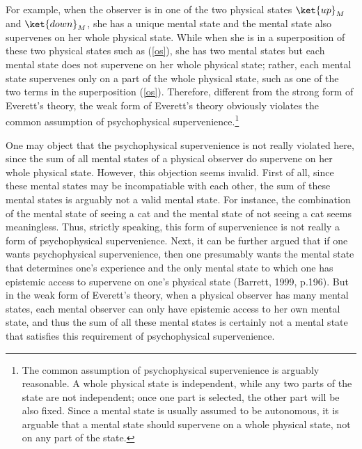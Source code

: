 For example, when the observer is in one of the two physical states  $\ket{up}_M$ and $\ket{down}_M$, she has a unique mental state and the mental state also supervenes on her whole physical state. While when she is in a superposition of these two physical states such as (\ref{os}), she has two mental states but each mental state does not supervene on her whole physical state; rather, each mental state supervenes only on a part of the whole physical state, such as one of the two terms in the superposition (\ref{os}).
Therefore, different from the strong form of Everett's theory,  the weak form of Everett's theory obviously violates the common assumption of psychophysical supervenience.\footnote{The common assumption of psychophysical supervenience is arguably reasonable. A whole physical state is independent, while any two parts of the state are not independent; once one part is selected, the other part will be also fixed. Since a mental state is usually assumed to be autonomous, it is arguable that a mental state should supervene on a whole physical state, not on any part of the state.}

One may object that the psychophysical supervenience is not really violated here, since the sum of all mental states of a physical observer do supervene on her whole physical state.
However, this objection seems invalid.
First of all, since these mental states may be incompatiable with each other, the sum of these mental states is arguably not a valid mental state. For instance, the combination of the mental state of seeing a cat and the mental state of not seeing a cat seems meaningless. 
Thus, strictly speaking, this form of supervenience is not really a form of psychophysical supervenience.
Next, it can be further argued that if one wants psychophysical supervenience, then one presumably wants the mental state that determines one's experience and the only mental state to which one has epistemic access to supervene on one's physical state (Barrett, 1999, p.196). But in the weak form of Everett's theory, when a physical observer has many mental states, each mental observer can only have epistemic access to her own mental state, and thus the sum of all these mental states is certainly not a mental state that satisfies this requirement of psychophysical supervenience. 

